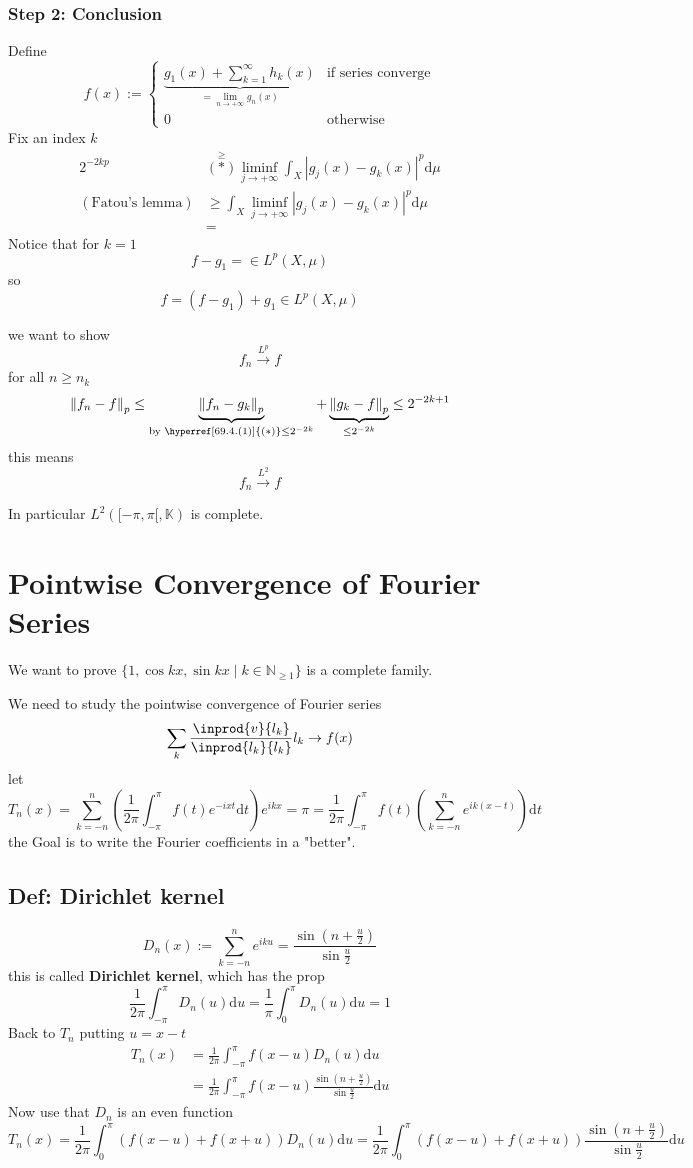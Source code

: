 \documentclass{book}
\newcommand{\abs}[1]{\left\lvert #1 \right\rvert}
\newcommand{\leftbracket}{[}
\begin{document}
\subsection{Step 2: Conclusion}
Define$$f(x):=\begin{cases}
    \underbrace{g_1(x)+\sum\limits_{k=1}^\infty h_k(x)}\limits_{=\lim\limits_{n\rightarrow+\infty}g_n(x)} &\text{if series converge}
    \\ 0&\text{otherwise}
\end{cases}$$
Fix an index $k$
$$\begin{aligned}
    2^{-2kp}&\stackrel{\geq}{\hyperref[69.4.(1)]{(*)}}\liminf\limits_{j\rightarrow+\infty}\int_X\abs{g_j(x)-g_k(x)}^p\text{d}\mu\\
    (\text{Fatou's lemma})&\geq\int_X\liminf\limits_{j\rightarrow+\infty}\abs{g_j(x)-g_k(x)}^p\text{d}\mu\\
    &=
\end{aligned}$$
Notice that for $k=1$ $$f-g_1=\in L^p(X,\mu)$$
so
$$f=(f-g_1)+g_1\in L^p(X,\mu)$$

we want to show $$f_n\stackrel{L^p}{\rightarrow}f$$
for all $n\geq n_k$
$$\norm{f_n-f}_p\leq\underbrace{\norm{f_n-g_k}_p}\limits_{\text{by }\hyperref[69.4.(1)]{(*)}\leq 2^{-2k}}+\underbrace{\norm{g_k-f}_p}\limits_{\leq 2^{-2k}}\leq 2^{-2k+1}$$
this means $$f_n\stackrel{L^2}\rightarrow f$$

In particular $L^2(\leftbracket -\pi,\pi\leftbracket,\mathbb{K})$ is complete.
\chapter{Pointwise Convergence of Fourier Series}
We want to prove $\{1,\cos kx,\sin kx\mid k\in \mathbb{N}_{\geq 1}\}$ is a complete family.

We need to study the pointwise convergence of Fourier series$$\sum\limits_k\frac{\inprod{v}{l_k}}{\inprod{l_k}{l_k}}l_k\rightarrow f(x)$$
let $$T_n(x)=\sum\limits_{k=-n}^n\left(\frac{1}{2\pi}\int_{-\pi}^\pi f(t)e^{-ixt}\text{d}t\right)e^{ikx}=\pi=\frac{1}{2\pi}\int_{-\pi}^\pi f(t)\left(\sum\limits_{k=-n}^n e^{ik(x-t)}\right)\text{d}t$$
the Goal is to write the Fourier coefficients in a "better".
\section{Def: Dirichlet kernel}$$D_n(x):=\sum\limits_{k=-n}^ne^{iku}=\frac{\sin(n+\frac{u}2)}{\sin\frac{u}2}$$
this is called \textbf{Dirichlet kernel}, which has the prop
$$\frac{1}{2\pi}\int_{-\pi}^\pi D_n(u)\text{d}u=\frac{1}{\pi}\int_0^\pi D_n(u)\text{d}u=1$$
Back to $T_n$ putting $u=x-t$
$$\begin{aligned}
    T_n(x)&=\frac{1}{2\pi}\int_{-\pi}^\pi f(x-u)D_n(u)\text{d}u\\
    &=\frac{1}{2\pi}\int_{-\pi}^\pi f(x-u)\frac{\sin(n+\frac{u}2)}{\sin\frac{u}2}\text{d}u
\end{aligned}$$
Now use that $D_n$ is an even function
$$T_n(x)=\frac{1}{2\pi}\int_0^\pi \left(f(x-u)+f(x+u)\right)D_n(u)\text{d}u=\frac{1}{2\pi}\int_0^\pi\left(f(x-u)+f(x+u)\right)\frac{\sin(n+\frac{u}2)}{\sin\frac{u}2}\text{d}u$$
\end{document}
